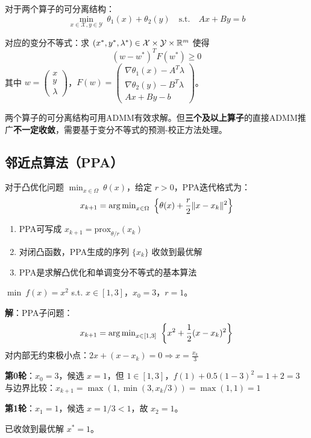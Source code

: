 对于两个算子的可分离结构：
\[
\min_{x \in \mathcal{X}, y \in \mathcal{Y}}\ \theta_1(x) + \theta_2(y)\quad \text{s.t.}\quad Ax + By = b
\]

对应的变分不等式：求 $(x^*, y^*, \lambda^*) \in \mathcal{X} \times \mathcal{Y} \times \mathbb{R}^m$ 使得
\[
(w - w^*)^T F(w^*) \geq 0
\]
其中 $w = \begin{pmatrix} x \\ y \\ \lambda \end{pmatrix}$，$F(w) = \begin{pmatrix} \nabla \theta_1(x) - A^T \lambda \\ \nabla \theta_2(y) - B^T \lambda \\ Ax + By - b \end{pmatrix}$。

\begin{notebox}[ADMM的收敛性]
两个算子的可分离结构可用ADMM有效求解。但\textbf{三个及以上算子}的直接ADMM推广\textbf{不一定收敛}，需要基于变分不等式的预测-校正方法处理。
\end{notebox}

\subsection{邻近点算法（PPA）}

\begin{definition}[邻近点算法]
对于凸优化问题 $\min_{x \in \Omega}\ \theta(x)$，给定 $r > 0$，PPA迭代格式为：
\[
x_{k+1} = \argmin_{x \in \Omega}\ \left\{\theta(x) + \frac{r}{2}\|x - x_k\|^2\right\}
\]
\end{definition}

\begin{property}[PPA性质]
\begin{enumerate}[label=(\arabic*)]
    \item PPA可写成 $x_{k+1} = \text{prox}_{\theta/r}(x_k)$
    \item 对闭凸函数，PPA生成的序列 $\{x_k\}$ 收敛到最优解
    \item PPA是求解凸优化和单调变分不等式的基本算法
\end{enumerate}
\end{property}

\begin{example}[PPA的迭代]
$\min\ f(x) = x^2$ s.t. $x \in [1, 3]$，$x_0 = 3$，$r = 1$。

\textbf{解}：PPA子问题：
\[
x_{k+1} = \operatorname{arg\,min}_{x \in [1,3]}\ \left\{x^2 + \frac{1}{2}(x - x_k)^2\right\}
\]
对内部无约束极小点：$2x + (x - x_k) = 0 \Rightarrow x = \frac{x_k}{3}$

\textbf{第0轮}：$x_0 = 3$，候选 $x = 1$，但 $1 \in [1,3]$，$f(1) + 0.5(1-3)^2 = 1 + 2 = 3$
与边界比较：$x_{k+1} = \max(1, \min(3, x_k/3)) = \max(1, 1) = 1$

\textbf{第1轮}：$x_1 = 1$，候选 $x = 1/3 < 1$，故 $x_2 = 1$。

已收敛到最优解 $x^* = 1$。
\end{example}


